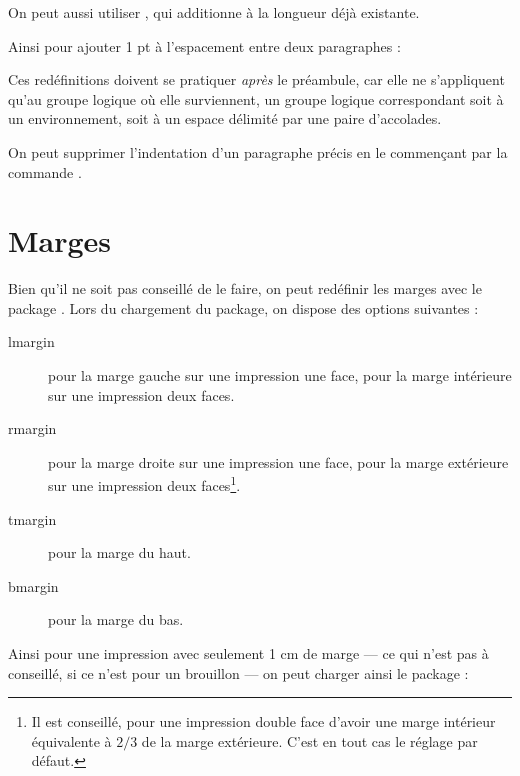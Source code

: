 \begin{latexcode}
\setlength{\parindent}{3ex}
\end{latexcode}

On peut aussi utiliser , qui additionne  à la longueur déjà existante.

Ainsi pour ajouter 1 pt à l'espacement entre deux paragraphes :

\begin{latexcode}
\addtolength{\parskip}{1pt}
\end{latexcode}

Ces redéfinitions doivent se pratiquer \emph{après} le préambule, car elle ne s'appliquent qu'au groupe logique où elle surviennent, un groupe logique correspondant soit à un environnement, soit à un espace délimité par une paire d'accolades.

\begin{plusloins}
On peut supprimer l'indentation d'un paragraphe précis en le commençant par la commande .
\end{plusloins}

\section{Marges}

Bien qu'il ne soit pas conseillé de le faire, on peut redéfinir les marges avec le package . Lors du chargement du package, on dispose des options suivantes :
\begin{description}
\item[lmargin]pour la marge gauche sur une impression une face, pour la marge intérieure sur une impression deux faces.
\item[rmargin]pour la marge droite sur une impression une face, pour la marge extérieure sur une impression deux faces\footnote{Il est conseillé, pour une impression double face d'avoir une marge intérieur équivalente à $2/3$ de la marge extérieure. C'est en tout cas le réglage par défaut.}.
\item[tmargin]pour la marge du haut.
\item[bmargin]pour la marge du bas.
\end{description}

Ainsi pour une impression avec seulement 1 cm de marge --- ce qui n'est pas à conseillé, si ce n'est pour un brouillon --- on peut charger ainsi le package :

\begin{latexcode}
\usepackage[lmargin=1cm,rmargin=1cm,tmargin=1cm,bmargin=1cm]{geometry}
\end{latexcode}

